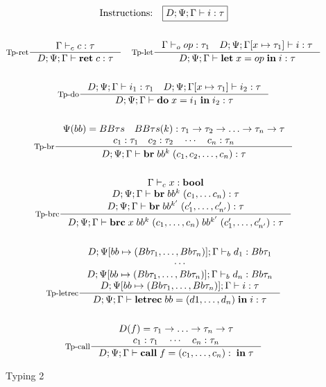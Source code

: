 \documentclass[a4paper, oneside, 10pt, draft]{memoir}
\begin{document}
\begin{figure}
  \begin{gather*}
    \text{Instructions:} \quad \boxed{D ; \Psi ; \Gamma |- i : \tau}\\\\
    \inference[Tp-ret]{\Gamma \tpc c : \tau}{D ; \Psi ;
      \Gamma |- \iret{c} : \tau} \quad
    \inference[Tp-let]{\Gamma \tpop op : \tau_1 \quad D ; \Psi ;
      \Gamma[x \mapsto \tau_1] |- i : \tau}{D ; \Psi ; \Gamma |-
      \ilet{x}{op}{i} : \tau}\\\\
    \inference[Tp-do]{D;\Psi;\Gamma |- i_1 : \tau_1 \quad
      D;\Psi;\Gamma[x \mapsto \tau_1] |- i_2 : \tau} {D;\Psi;\Gamma |-
      \ido{x}{i_1}{i_2} : \tau}\\\\
    \inference[Tp-br]{\Psi(bb) = BB\tau{}s \quad BB\tau{}s(k) : \tau_1 -> \tau_2 -> \dotsc ->
      \tau_n -> \tau\\
      c_1 : \tau_1 \quad c_2 : \tau_2 \quad \dotsb \quad c_n : \tau_n}
    {D;\Psi;\Gamma |- \ibr{bb^k}(c_1, c_2, \dotsc, c_n) : \tau}\\\\
    \inference[Tp-brc]{\Gamma \tpc x : \tbool \\ D;\Psi;\Gamma |-
      \ibr{bb^k}{(c_1, \dotsc c_n)} : \tau \\
    D;\Psi;\Gamma |- \ibr{bb^{k'}}{(c'_1, \dotsc, c'_{n'})} : \tau}{D;\Psi;\Gamma |- \ibrc{x}{bb^k}{(c_1, \dotsc,
        c_n)}{bb^{k'}}{(c'_1, \dotsc, c'_{n'})} : \tau} \\\\
    \inference[Tp-letrec]{D;\Psi[bb \mapsto (Bb \tau_1, \dotsc, Bb
      \tau_n)];\Gamma \tpb d_1 : Bb \tau_1\\
      \dotsb \\D;\Psi[bb \mapsto (Bb \tau_1, \dotsc, Bb
      \tau_n)];\Gamma \tpb d_n : Bb\tau_n \\
      D;\Psi[bb \mapsto (Bb \tau_1, \dotsc, Bb
      \tau_n)];\Gamma |- i : \tau}{D;\Psi;\Gamma |- \iletrec{bb}{(d1,
        \dotsc, d_n)}{i} : \tau}\\\\
    \inference[Tp-call]{D(f) = \tau_1 -> \dotsc -> \tau_n -> \tau\\
    c_1 : \tau_1 \quad \dotsb \quad c_n : \tau_n}{D;\Psi;\Gamma |- \icall{f}{(c_1, \dotsc,
        c_n)} : \tau}
  \end{gather*}
  \caption{Typing 2}
  \label{fig:type-judgement-2}
\end{figure}
\end{document}
